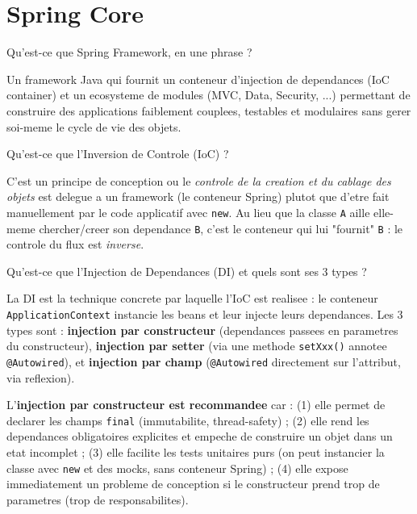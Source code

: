\documentclass[11pt,a4paper]{article}
\begin{document}
\newpage
\section{Spring Core}

\begin{question} Qu'est-ce que Spring Framework, en une phrase ?
\end{question}
\begin{reponse}
Un framework Java qui fournit un conteneur d'injection de dependances (IoC container) et un ecosysteme de modules (MVC, Data, Security, ...) permettant de construire des applications faiblement couplees, testables et modulaires sans gerer soi-meme le cycle de vie des objets.
\end{reponse}

\begin{question} Qu'est-ce que l'Inversion de Controle (IoC) ?
\end{question}
\begin{reponse}
C'est un principe de conception ou le \emph{controle de la creation et du cablage des objets} est delegue a un framework (le conteneur Spring) plutot que d'etre fait manuellement par le code applicatif avec \texttt{new}. Au lieu que la classe \texttt{A} aille elle-meme chercher/creer son dependance \texttt{B}, c'est le conteneur qui lui "fournit" \texttt{B} : le controle du flux est \emph{inverse}.
\end{reponse}

\begin{question} Qu'est-ce que l'Injection de Dependances (DI) et quels sont ses 3 types ?
\end{question}
\begin{reponse}
La DI est la technique concrete par laquelle l'IoC est realisee : le conteneur \texttt{ApplicationContext} instancie les beans et leur injecte leurs dependances. Les 3 types sont : \textbf{injection par constructeur} (dependances passees en parametres du constructeur), \textbf{injection par setter} (via une methode \texttt{setXxx()} annotee \texttt{@Autowired}), et \textbf{injection par champ} (\texttt{@Autowired} directement sur l'attribut, via reflexion).
\end{reponse}

\begin{cle}
L'\textbf{injection par constructeur est recommandee} car : (1) elle permet de declarer les champs \texttt{final} (immutabilite, thread-safety) ; (2) elle rend les dependances obligatoires explicites et empeche de construire un objet dans un etat incomplet ; (3) elle facilite les tests unitaires purs (on peut instancier la classe avec \texttt{new} et des mocks, sans conteneur Spring) ; (4) elle expose immediatement un probleme de conception si le constructeur prend trop de parametres (trop de responsabilites).
\end{cle}
\end{document}
